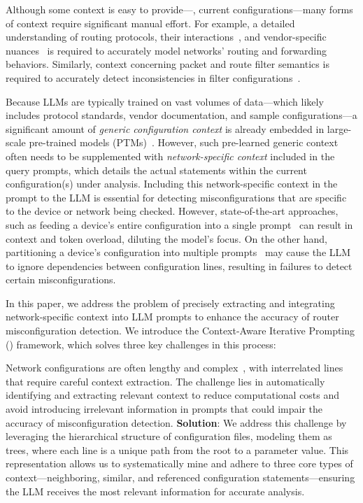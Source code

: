 Although some context is easy to provide---\eg, current
config\-urations---many forms of context require significant manual effort.
For example, a detailed understanding of routing protocols, their
interactions~\cite{le2007rr}, and vendor-specific nuances~\cite{ye2020hoyan}
is required to accurately model networks' routing and forwarding behaviors.
Similarly, context concerning packet and route filter semantics is required to
accurately detect inconsistencies in filter
configurations~\cite{kakarla2020finding}.

Because LLMs are typically trained on vast volumes of data---which likely
includes protocol standards, vendor documentation, and sample
configurations---a significant amount of \textit{generic configuration
context} is already embedded in large-scale pre-trained models
(PTMs)~\cite{qiu2020pre}. However, such pre-learned generic context often
needs to be supplemented with \textit{network-specific context} included in the query prompts, which details
the actual statements within the current configuration(s) under
analysis. 
Including this network-specific context in the prompt to the LLM is essential
for detecting misconfigurations that are specific to the device or network
being checked.
However, state-of-the-art 
approaches, such as feeding a device's entire configuration into a single
prompt~\cite{lican,li2024long} can result in context and token overload,
diluting the model's focus. On the other hand, partitioning a
device's configuration into multiple
prompts~\cite{lian2023configuration,chen2024automatic,wang2024identifying}
may cause the LLM to ignore dependencies between configuration lines,
resulting in failures to detect certain misconfigurations.

In this paper, we address the problem of precisely extracting and integrating network-specific context into LLM prompts to enhance the accuracy of router misconfiguration detection. We introduce the
Context-Aware Iterative Prompting (\sysname{}) framework, which
solves three key challenges in this process:

 Network
configurations are often lengthy and
complex~\cite{benson2009complexitymetrics}, with interrelated lines that
require careful context extraction. The challenge lies in automatically
identifying and extracting relevant context to reduce computational costs and
avoid introducing irrelevant information in prompts that could impair the accuracy of
misconfiguration detection. \textbf{Solution}: We address this challenge by
leveraging the hierarchical structure of configuration files, modeling them as
trees, where each line is a unique path from the root to a parameter value.
This representation allows us to systematically mine and adhere to three core types of
context---neighboring, similar, and referenced configuration
statements---ensuring the LLM receives the most relevant information for
accurate analysis.

